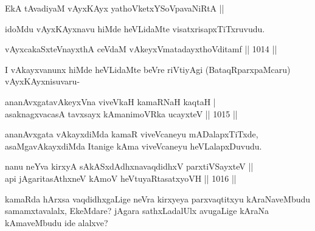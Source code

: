 \begin{shl}
EkA tAvadiyaM vAyxKAyx yathoVketxYSoVpavaNiRtA || 
\end{shl}

\begin{artha}
idoMdu vAyxKAyxnavu hiMde heVLidaMte visatxrisapxTiTxruvudu.
\end{artha}


\begin{shl}
vAyxcakaSxteV\s nayxthA ceVdaM vAkeyxVmatadayxthoVditamf ||  1014 || \\
\end{shl}

\begin{artha}
I vAkayxvanunx hiMde heVLidaMte beVre riVtiyAgi (BataqRparxpaMcaru) vAyxKAyxnisuvaru-
\end{artha}



\begin{shl}
ananAvxgatavAkeyxVna viveVkaH kamaRNaH kaqtaH | \\
asaknagxvacasA tavxsayx kAmanimoVRka ucayxteV \hfill ||  1015 ||
\end{shl}

\begin{artha}
ananAvxgata vAkayxdiMda kamaR viveVcaneyu mADalapxTiTxde, asaMgavAkayxdiMda Itanige kAma viveVcaneyu heVLalapxDuvudu.
\end{artha}


\begin{shl}
nanu \footnotemark[1]neYva kirxyA sAkASxdAdhxnavaqdidhxV parxtiVSayxteV ||\\  
api jAgaritasAthxneV kAmoV heVtuyaRtasatxyoVH \hfill||  1016 ||
\end{shl}

\begin{artha}
kamaRda hArxsa vaqdidhxgaLige neVra kirxyeya parxvaqtitxyu kAraNaveMbudu samamxtavalalx, EkeMdare? jAgara sathxLadalUlx avugaLige kAraNa kAmaveMbudu ide alalxve?
\end{artha}

